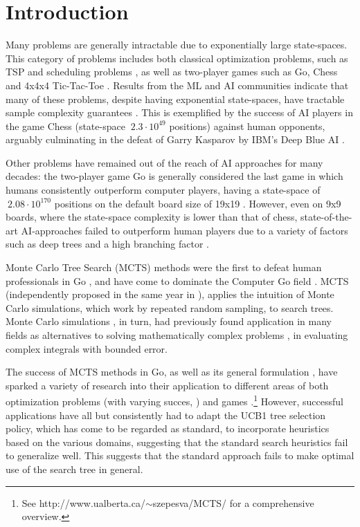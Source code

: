 \section{Introduction}
Many problems are generally intractable due to exponentially large state-spaces. This category of problems includes both classical optimization problems, such as TSP and scheduling problems \cite{browne2012survey}, as well as two-player games such as Go, Chess and 4x4x4 Tic-Tac-Toe \cite{chaslot2010monte, sharma2008knowledge}.
Results from the ML and AI communities indicate that many of these problems, despite having exponential state-spaces, have tractable sample complexity guarantees \cite{sharma2008knowledge}. This is exemplified by the success of AI players in the game Chess (state-space $~ 2.3 \cdot 10^{49}$ positions) against human opponents, arguably culminating in the defeat of Garry Kasparov by IBM's Deep Blue AI \cite{campbell2002deep}.

Other problems have remained out of the reach of AI approaches for many decades: the two-player game Go is generally considered the last game in which humans consistently outperform computer players, having a state-space of $~2.08 \cdot 10^{170}$ positions on the default board size of 19x19 \cite{tromp2007combinatorics}. However, even on 9x9 boards, where the state-space complexity is lower than that of chess, state-of-the-art AI-approaches failed to outperform human players due to a variety of factors such as deep trees and a high branching factor \cite{browne2012survey}.

Monte Carlo Tree Search (MCTS) methods were the first to defeat human professionals in Go \cite{coulom2007efficient}, and have come to dominate the Computer Go field \cite{chaslot2010monte}. MCTS (independently proposed in the same year in \cite{coulom2007efficient, kocsis2006bandit, chaslot2006monte}), applies the intuition of Monte Carlo simulations, which work by repeated random sampling, to search trees. Monte Carlo simulations \cite{metropolis1985monte}, in turn, had previously found application in many fields as alternatives to solving mathematically complex problems \cite{liu2008monte}, \eg in evaluating complex integrals with bounded error.

The success of MCTS methods in Go, as well as its general formulation \cite{chaslot2010monte}, have sparked a variety of research into their application to different areas of both optimization problems (with varying succes, \eg \cite{rimmel2011optimization, cazenave2009monte}) and games \cite{schadd2008single, gelly2012grand}.\footnote{See http://www.ualberta.ca/$\sim$szepesva/MCTS/ for a comprehensive overview.} However, successful applications have all but consistently had to adapt the UCB1 tree selection policy, which has come to be regarded as standard, to incorporate heuristics based on the various domains, suggesting that the standard search heuristics fail to generalize well. This suggests that the standard approach fails to make optimal use of the search tree in general.

